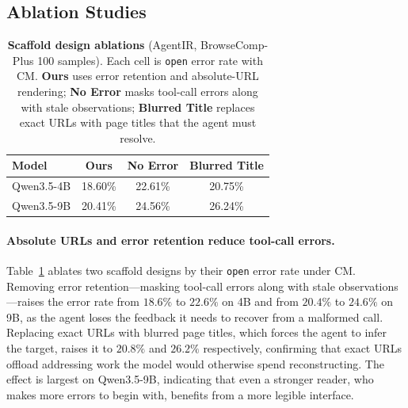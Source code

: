\subsection{Ablation Studies}
\label{exp:ablation}

\begin{table} %
\centering
\small
\setlength{\tabcolsep}{4pt} %
\vspace{-1.2em} %
\begin{tabular}{l ccc}
\toprule
Model & Ours & No Error & Blurred Title \\
\midrule
Qwen3.5-4B & 18.60\% & 22.61\% & 20.75\% \\
Qwen3.5-9B & 20.41\% & 24.56\% & 26.24\% \\
\bottomrule
\end{tabular}
\vspace{-0.5em} %
\caption{
\textbf{Scaffold design ablations} (AgentIR, BrowseComp-Plus 100 samples). Each cell is \texttt{open} error rate with CM. \textbf{Ours} uses error retention and absolute-URL rendering; \textbf{No Error} masks tool-call errors along with stale observations; \textbf{Blurred Title} replaces exact URLs with page titles that the agent must resolve. 
}
\vspace{-1em} %
\label{tab:ablation-scaffold}
\end{table}
 
\paragraph{Absolute URLs and error retention reduce tool-call errors.}
Table~\ref{tab:ablation-scaffold} ablates two scaffold designs by their \texttt{open} error rate under CM. Removing error retention---masking tool-call errors along with stale observations---raises the error rate from $18.6\%$ to $22.6\%$ on 4B and from $20.4\%$ to $24.6\%$ on 9B, as the agent loses the feedback it needs to recover from a malformed call. Replacing exact URLs with blurred page titles, which forces the agent to infer the target, raises it to $20.8\%$ and $26.2\%$
respectively, confirming that exact URLs offload addressing work the model would otherwise spend reconstructing. The effect is largest on Qwen3.5-9B, indicating that even a stronger reader, who makes more errors to begin with, benefits from a more legible interface.

 
 
